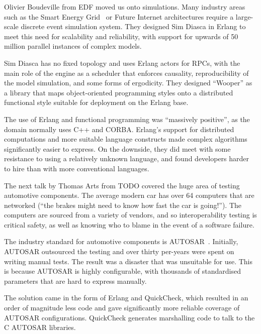 \documentclass{jfp1}
\begin{document}
Olivier Boudeville from EDF moved us onto simulations. Many industry areas such as the Smart Energy Grid~\cite{x} or Future Internet architectures require a large-scale discrete event simulation system. They designed Sim Diasca in Erlang to meet this need for scalability and reliability, with support for upwards of 50 million parallel instances of complex models.

Sim Diasca has no fixed topology and uses Erlang actors for RPCs, with the main role of the engine as a scheduler that enforces causality, reproducibility of the model simulation, and some forms of ergodicity. They designed ``Wooper'' as a library that maps object-oriented programming styles onto a distributed functional style suitable for deployment on the Erlang base.

The use of Erlang and functional programming was ``massively positive'', as the domain normally uses C++ and CORBA.  Erlang's support for distributed computations and more suitable language constructs made complex algorithms significantly easier to express.  On the downside, they did meet with some resistance to using a relatively unknown language, and found developers harder to hire than with more conventional languages.


The next talk by Thomas Arts from TODO covered the huge area of testing automotive components. The average modern car has over 64 computers that are networked (``the brakes might need to know how fast the car is going!'').  The computers are sourced from a variety of vendors, and so interoperability testing is critical safety, as well as knowing who to blame in the event of a software failure.

The industry standard for automotive components is AUTOSAR~\cite{x}. Initially, AUTOSAR outsourced the testing and over thirty per-years were spent on writing manual tests. The result was a disaster that was unsuitable for use. This is because AUTOSAR is highly configurable, with thousands of standardised parameters that are hard to express manually.

The solution came in the form of Erlang and QuickCheck, which resulted in an order of magnitude less code and gave significantly more reliable coverage of AUTOSAR configurations.  QuickCheck generates marshalling code to talk to the C AUTOSAR libraries.
\end{document}
